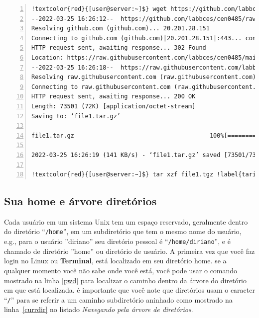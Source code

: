 \documentclass[letter,11pt]{book}
\begin{document}
\begin{Verbatim}[commandchars=!\{\},numbers=left,firstnumber=last,label=Baixando arquivos, frame=topline,fontsize=\scriptsize]
!textcolor{red}{[user@server:~]$} wget https://github.com/labbces/cen0485/raw/main/linux/practicas/file1.tar.gz !label{wgetini}
--2022-03-25 16:26:12--  https://github.com/labbces/cen0485/raw/main/linux/practicas/file1.tar.gz !label{wgetinistart}
Resolving github.com (github.com)... 20.201.28.151
Connecting to github.com (github.com)|20.201.28.151|:443... connected.
HTTP request sent, awaiting response... 302 Found
Location: https://raw.githubusercontent.com/labbces/cen0485/main/linux/practicas/file1.tar.gz [following]
--2022-03-25 16:26:18--  https://raw.githubusercontent.com/labbces/cen0485/main/linux/practicas/file1.tar.gz
Resolving raw.githubusercontent.com (raw.githubusercontent.com)... 185.199.108.133, 185.199.109.133, 185.199.111.133, ...
Connecting to raw.githubusercontent.com (raw.githubusercontent.com)|185.199.108.133|:443... connected.
HTTP request sent, awaiting response... 200 OK
Length: 73501 (72K) [application/octet-stream]
Saving to: ‘file1.tar.gz’

file1.tar.gz                                      100%[==========================================================================================================>]  71,78K   141KB/s    in 0,5s    

2022-03-25 16:26:19 (141 KB/s) - ‘file1.tar.gz’ saved [73501/73501] !label{wgetinistop}

!textcolor{red}{[user@server:~]$} tar xzf file1.tgz !label{tarini}
\end{Verbatim} 

\subsection{Sua home e árvore diretórios\label{homedir}}

Cada usuário em um sistema Unix tem um espaço reservado, geralmente dentro do diretório ``\Verb+/home+'', em um subdiretório que tem o mesmo nome do usuário, e.g., para o usuário ''diriano'' seu diretório pessoal é ``\Verb+/home/diriano+'', e é chamado de diretório ''home'' ou diretório de usuário.  A primeira vez que você faz login no Linux ou \textbf{Terminal}, está localizado em seu diretório home. se a qualquer momento você não sabe onde você está, você pode usar o comando mostrado na linha \ref{pwd} para localizar o caminho dentro da árvore do diretório em que está localizada. é importante que você note que diretórios usam o caracter ``\Verb+/+'' para se referir a um caminho subdiretório aninhado como mostrado na linha~\ref{currdir} no listado \textit{Navegando pela árvore de diretórios}.
\end{document}
